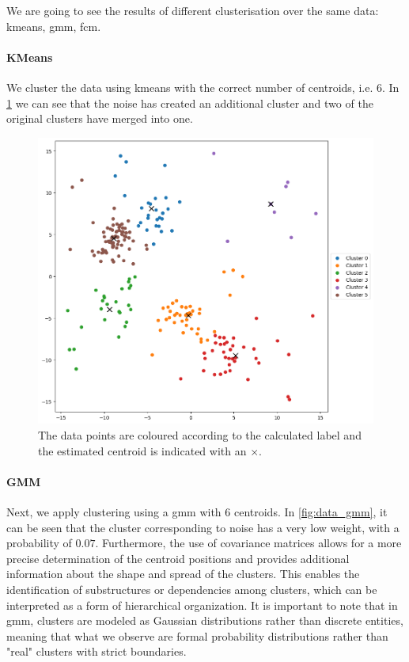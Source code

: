 \noindent We are going to see the results of different clusterisation over the same data: \gls{kmeans}, \gls{gmm}, \gls{fcm}.
\paragraph{KMeans} We cluster the data using \gls{kmeans} with the correct number of centroids, i.e. $6$. In \cref{fig:data_kmeans} we can see that the noise has created an additional cluster and two of the original clusters have merged into one.
\begin{figure}[H]
	\centering
	\includegraphics[width=0.9\linewidth]{Figures/dati_kmeans.png}
	\caption[Example of \gls{kmeans} clustering]{The data points are coloured according to the calculated label and the estimated centroid is indicated with an $\times$.}
	\label{fig:data_kmeans}
\end{figure}

\paragraph{GMM} Next, we apply clustering using a \gls{gmm} with $6$ centroids. In \cref{fig:data_gmm}, it can be seen that the cluster corresponding to noise has a very low weight, with a probability of $0.07$. Furthermore, the use of covariance matrices allows for a more precise determination of the centroid positions and provides additional information about the shape and spread of the clusters. This enables the identification of substructures or dependencies among clusters, which can be interpreted as a form of hierarchical organization. It is important to note that in \gls{gmm}, clusters are modeled as Gaussian distributions rather than discrete entities, meaning that what we observe are formal probability distributions rather than "real" clusters with strict boundaries.

